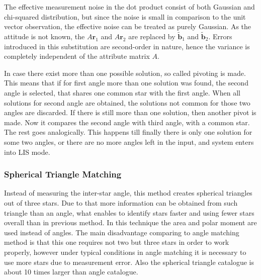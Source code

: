 \documentclass[12pt,a4paper,oneside]{article}
\begin{document}
The effective measurement noise in the dot product consist of both Gaussian and chi-squared distribution, but since the noise is small in comparison to the unit vector observation, the effective noise can be treated as purely Gaussian. As the attitude is not known, the $A\bm{r}_1$ and $A\bm{r}_2$ are replaced by $\tilde{\bm{b}}_1$ and $\tilde{\bm{b}}_2$. Errors introduced in this substitution are second-order in nature, hence the variance is completely independent of the attribute matrix $A$.

In case there exist more than one possible solution, so called pivoting is made. This means that if for first angle more than one solution was found, the second angle is selected, that shares one common star with the first angle. When all solutions for second angle are obtained, the solutions not common for those two angles are discarded. If there is still more than one solution, then another pivot is made. Now it compares the second angle with third angle, with a common star. The rest goes analogically. This happens till finally there is only one solution for some two angles, or there are no more angles left in the input, and system enters into LIS mode.

\subsubsection{Spherical Triangle Matching}

Instead of measuring the inter-star angle, this method creates spherical triangles out of three stars. Due to that more information can be obtained from such triangle than an angle, what enables to identify stars faster and using fewer stars overall than in previous method. In this technique the area and polar moment are used instead of angles. The main disadvantage comparing to angle matching method is that this one requires not two but three stars in order to work properly, however under typical conditions in angle matching it is necessary to use more stars due to measurement error. Also the spherical triangle catalogue is about 10 times larger than angle catalogue\cite{cole2004fast}.
\end{document}
